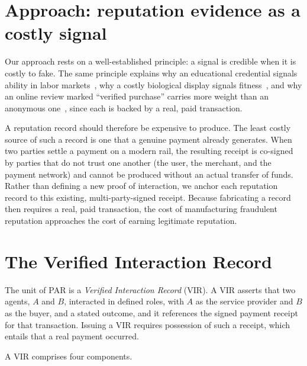 \documentclass[11pt]{article}
\begin{document}
\section{Approach: reputation evidence as a costly signal}
Our approach rests on a well-established principle: a signal is credible when it is
costly to fake. The same principle explains why an educational credential signals
ability in labor markets~\cite{spence1973signaling}, why a costly biological display
signals fitness~\cite{zahavi1975handicap}, and why an online review marked ``verified
purchase'' carries more weight than an anonymous one~\cite{resnick2002}, since each is
backed by a real, paid transaction.

A reputation record should therefore be expensive to produce. The least costly source
of such a record is one that a genuine payment already generates. When two parties
settle a payment on a modern rail, the resulting receipt is co-signed by parties that
do not trust one another (the user, the merchant, and the payment network) and cannot
be produced without an actual transfer of funds. Rather than defining a new proof of
interaction, we anchor each reputation record to this existing, multi-party-signed
receipt. Because fabricating a record then requires a real, paid transaction, the cost
of manufacturing fraudulent reputation approaches the cost of earning legitimate
reputation.

\section{The Verified Interaction Record}
The unit of PAR is a \emph{Verified Interaction Record} (VIR). A VIR asserts that two
agents, $A$ and $B$, interacted in defined roles, with $A$ as the service provider and
$B$ as the buyer, and a stated outcome, and it references the signed payment receipt
for that transaction. Issuing a VIR requires possession of such a receipt, which
entails that a real payment occurred.

A VIR comprises four components.
\end{document}

